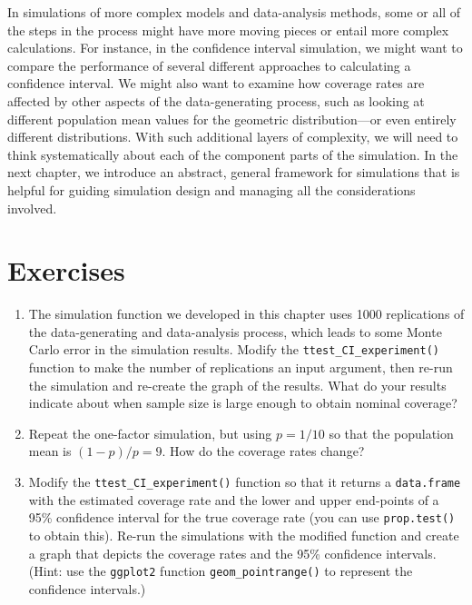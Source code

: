 \documentclass[
]{book}
\begin{document}
In simulations of more complex models and data-analysis methods, some or all of the steps in the process might have more moving pieces or entail more complex calculations.
For instance, in the confidence interval simulation, we might want to compare the performance of several different approaches to calculating a confidence interval.
We might also want to examine how coverage rates are affected by other aspects of the data-generating process, such as looking at different population mean values for the geometric distribution---or even entirely different distributions.
With such additional layers of complexity, we will need to think systematically about each of the component parts of the simulation.
In the next chapter, we introduce an abstract, general framework for simulations that is helpful for guiding simulation design and managing all the considerations involved.

\section{Exercises}\label{exercises}

\begin{enumerate}
\def\labelenumi{\arabic{enumi}.}
\item
  The simulation function we developed in this chapter uses 1000 replications of the data-generating and data-analysis process, which leads to some Monte Carlo error in the simulation results. Modify the \texttt{ttest\_CI\_experiment()} function to make the number of replications an input argument, then re-run the simulation and re-create the graph of the results. What do your results indicate about when sample size is large enough to obtain nominal coverage?
\item
  Repeat the one-factor simulation, but using \(p = 1/10\) so that the population mean is \((1 - p) / p = 9\). How do the coverage rates change?
\item
  Modify the \texttt{ttest\_CI\_experiment()} function so that it returns a \texttt{data.frame} with the estimated coverage rate and the lower and upper end-points of a 95\% confidence interval for the true coverage rate (you can use \texttt{prop.test()} to obtain this). Re-run the simulations with the modified function and create a graph that depicts the coverage rates and the 95\% confidence intervals. (Hint: use the \texttt{ggplot2} function \texttt{geom\_pointrange()} to represent the confidence intervals.)
\end{enumerate}
\end{document}
